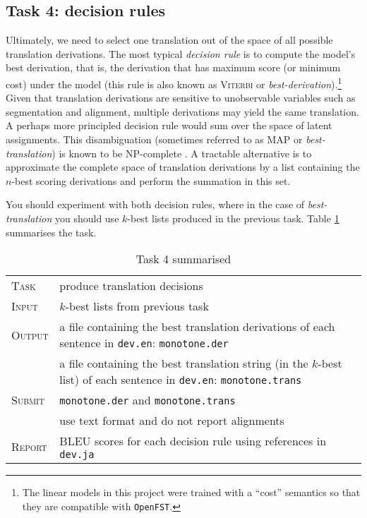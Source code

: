 \subsection{Task 4: decision rules}

Ultimately, we need to select one translation out of the space of all possible translation derivations.
The most typical \emph{decision rule} is to compute the model's best derivation, that is, the derivation that has maximum score (or minimum cost) under the model (this rule is also known as \textsc{Viterbi} or \emph{best-derivation}).\footnote{The linear models in this project were trained with a ``cost'' semantics so that they are compatible with \texttt{OpenFST}.}
Given that translation derivations are sensitive to unobservable variables such as segmentation and alignment, multiple derivations may yield the same translation. 
A perhaps more principled decision rule would sum over the space of latent assignments.
This disambiguation (sometimes referred to as \textsc{MAP} or \emph{best-translation}) is known to be NP-complete \citep{Simaan:1996:complexity}.
A tractable alternative is to approximate the complete space of translation derivations by a list containing the $n$-best scoring derivations and perform the summation in this set.

You should experiment with both decision rules, where in the case of \emph{best-translation} you should use $k$-best lists produced in the previous task.
Table \ref{tab:task4} summarises the task. 

\begin{table}\centering
\begin{tabular}{l p{12cm}}
\textsc{Task}   &  produce translation decisions \\
\textsc{Input}  &  $k$-best lists from previous task \\
\textsc{Output} &  a file containing the best translation derivations of each sentence in \texttt{dev.en}: \texttt{monotone.der}\\
    			&  a file containing the best translation string (in the $k$-best list) of each sentence in \texttt{dev.en}: \texttt{monotone.trans}\\
\textsc{Submit} &  \texttt{monotone.der} and \texttt{monotone.trans}\\
                &  use text format and do not report alignments\\  
\textsc{Report} & BLEU scores for each decision rule using references in \texttt{dev.ja} \\             
\end{tabular}
\caption{\label{tab:task4}Task 4 summarised}
\end{table}

